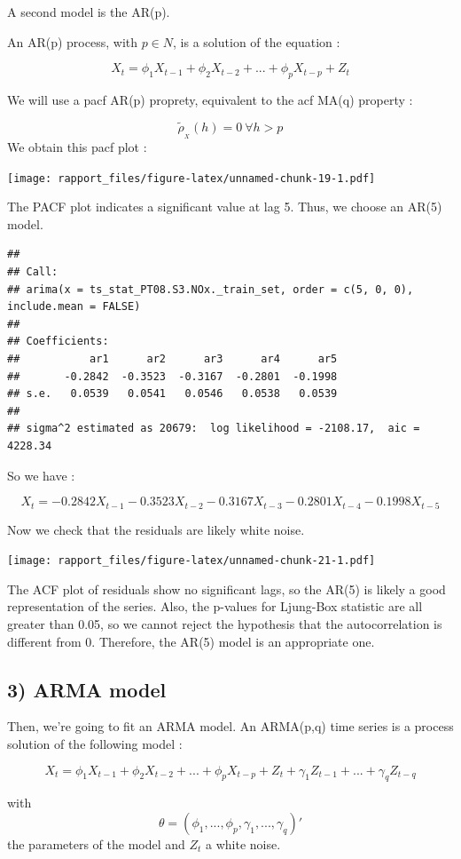 \documentclass[]{article}
\begin{document}
A second model is the AR(p).

An AR(p) process, with \(p \in N\), is a solution of the equation :

\[
X_t = \phi_{1}X_{t-1} + \phi_{2}X_{t-2} + ... + \phi_{p}X_{t-p} + Z_{t} 
\]

We will use a pacf AR(p) proprety, equivalent to the acf MA(q) property
:

\[
\tilde{\rho}_{_X}(h) = 0 \ \forall h>p 
\] We obtain this pacf plot :

\texttt{[image: rapport\_files/figure-latex/unnamed-chunk-19-1.pdf]}

The PACF plot indicates a significant value at lag 5. Thus, we choose an
AR(5) model.

\begin{verbatim}
## 
## Call:
## arima(x = ts_stat_PT08.S3.NOx._train_set, order = c(5, 0, 0), include.mean = FALSE)
## 
## Coefficients:
##           ar1      ar2      ar3      ar4      ar5
##       -0.2842  -0.3523  -0.3167  -0.2801  -0.1998
## s.e.   0.0539   0.0541   0.0546   0.0538   0.0539
## 
## sigma^2 estimated as 20679:  log likelihood = -2108.17,  aic = 4228.34
\end{verbatim}

So we have :

\[
X_t = -0.2842X_{t-1}-0.3523X_{t-2}-0.3167X_{t-3}-0.2801X_{t-4}-0.1998X_{t-5}
\]

Now we check that the residuals are likely white noise.

\texttt{[image: rapport\_files/figure-latex/unnamed-chunk-21-1.pdf]}

The ACF plot of residuals show no significant lags, so the AR(5) is
likely a good representation of the series. Also, the p-values for
Ljung-Box statistic are all greater than 0.05, so we cannot reject the
hypothesis that the autocorrelation is different from 0. Therefore, the
AR(5) model is an appropriate one.

\subsection{3) ARMA model}

Then, we're going to fit an ARMA model. An ARMA(p,q) time series is a
process solution of the following model :

\[
X_t= \phi_{1}X_{t-1} + \phi_{2}X_{t-2} + ... + \phi_{p}X_{t-p} + Z_{t} + \gamma_1Z_{t-1} + ... + \gamma_qZ_{t-q}
\]

with \[\theta=(\phi_{1},...,\phi_{p},\gamma_1,...,\gamma_q)'\] the
parameters of the model and \(Z_t\) a white noise.
\end{document}
